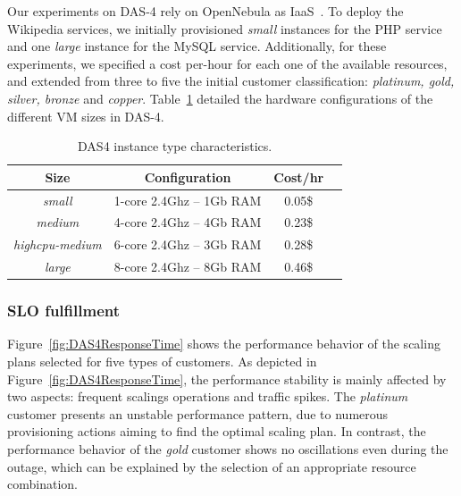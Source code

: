 Our experiments on DAS-4 rely on OpenNebula as IaaS~\cite{sotomayor_virtual_2009}. To deploy the Wikipedia services, we initially provisioned \emph{small} instances for the PHP service and one \emph{large} instance for the MySQL service. Additionally, for these experiments, we specified a cost per-hour for each one of the available resources, and extended from three to five the initial customer classification: \emph{platinum, gold, silver, bronze} and \emph{copper}. Table~\ref{DAS4instances} detailed the hardware configurations of the different VM sizes in DAS-4.


\begin{table}\label{DAS4instances}
  {\scriptsize 
\begin{center}
    \begin{tabular}{  | c | c | c | c | }
    \hline
       \textbf{Size}  & \textbf{Configuration} & \textbf{Cost/hr} \\ \hline
   \textit{small}   & 1-core 2.4Ghz -- 1Gb RAM&  0.05\$ \\ \hline
   \textit{medium}   & 4-core 2.4Ghz  -- 4Gb RAM&  0.23\$ \\ \hline
\textit{highcpu-medium} & 6-core 2.4Ghz -- 3Gb RAM& 0.28\$   \\ \hline
\textit{large} & 8-core 2.4Ghz  -- 8Gb RAM& 0.46\$   \\ \hline

 \end{tabular}
\end{center}
\vspace{-5mm}
\caption{DAS4 instance type characteristics.}
\label{DAS4instances}
}
\end{table}


\subsubsection{SLO fulfillment}

Figure~\ref{fig:DAS4ResponseTime} shows the performance behavior of the scaling plans selected for five types of customers. As depicted in Figure~\ref{fig:DAS4ResponseTime}, the performance stability is mainly affected by two aspects: frequent scalings operations and traffic spikes. The \emph{platinum} customer presents an unstable performance pattern, due to numerous provisioning actions aiming to find the optimal scaling plan. In contrast, the performance behavior of the \emph{gold} customer shows no oscillations even during the outage, which can be explained by the selection of an appropriate resource combination.

